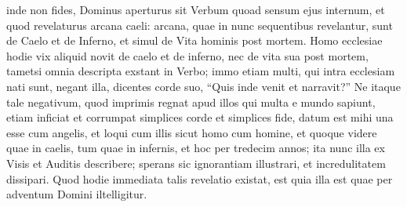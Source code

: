 \begin{topic}{1}
    inde non fides, Dominus aperturus sit Verbum quoad sensum ejus internum, et quod revelaturus arcana caeli: arcana,
    quae in nunc sequentibus revelantur, sunt de Caelo et de Inferno, et simul de Vita hominis post mortem.
    Homo ecclesiae hodie vix aliquid novit de caelo et de inferno, nec de vita sua post mortem, tametsi omnia descripta
    exstant in Verbo; immo etiam multi, qui intra ecclesiam nati sunt, negant illa, dicentes corde suo, ``Quis inde
    venit et narravit?''
    Ne itaque tale negativum, quod imprimis regnat apud illos qui multa e mundo sapiunt, etiam inficiat et corrumpat
    simplices corde et simplices fide, datum est mihi una esse cum angelis, et loqui cum illis sicut homo cum homine, et
    quoque videre quae in caelis, tum quae in infernis, et hoc per tredecim annos; ita nunc illa ex Visis et Auditis
    describere; sperans sic ignorantiam illustrari, et incredulitatem dissipari.
    Quod hodie immediata talis revelatio existat, est quia illa est quae per adventum Domini iltelligitur.
\end{topic}
